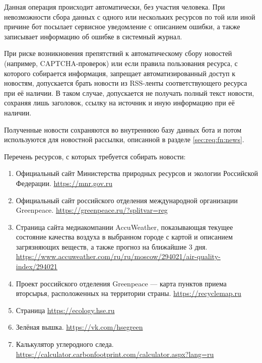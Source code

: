     Данная операция происходит автоматически, без участия человека. При невозможности сбора данных
    с одного или нескольких ресурсов по той или иной причине бот посылает сервисное уведомление
    с описанием ошибки, а также записывает информацию об ошибке в системный журнал.

    При риске возникновения препятствий к автоматическому сбору новостей (например, CAPTCHA-проверок)
    или если правила пользования ресурса, с которого собирается информация, запрещает автоматизированный
    доступ к новостям, допускается брать новости из RSS-ленты соответствующего ресурса при её наличии.
    В таком случае, допускается не получать полный текст новости, сохраняя лишь заголовок,
    ссылку на источник и иную информацию при её наличии.

    Полученные новости сохраняются во внутреннюю базу данных бота и потом используются для новостной
    рассылки, описанной в разделе \ref{sec:req:fn:news}.

    Перечень ресурсов, с которых требуется собирать новости:
    \begin{enumerate}
        \item
            Официальный сайт Министерства природных ресурсов и экологии Российской Федерации.
            \url{https://mnr.gov.ru}
        \item
            Официальный сайт российского отделения международной организации Greenpeace.
            \url{https://greenpeace.ru/?splitvar=reg}
        \item
            Страница сайта медиакомпании AccuWeather, показывающая текущее состояние качества воздуха
            в выбранном городе с картой и описанием загрязняющих веществ, а также прогноз на ближайшие
            3 дня. 
            \url{https://www.accuweather.com/ru/ru/moscow/294021/air-quality-index/294021}
        \item
            Проект российского отделения Greenpeace --- карта пунктов приема вторсырья,
            расположенных на территории страны.
            \url{https://recyclemap.ru}
        \item
            Страница \url{https://ecology.hse.ru}
        \item
            Зелёная вышка. \url{https://vk.com/hsegreen}
        \item
            Калькулятор углеродного следа.
            \url{https://calculator.carbonfootprint.com/calculator.aspx?lang=ru}

    \end{enumerate}

